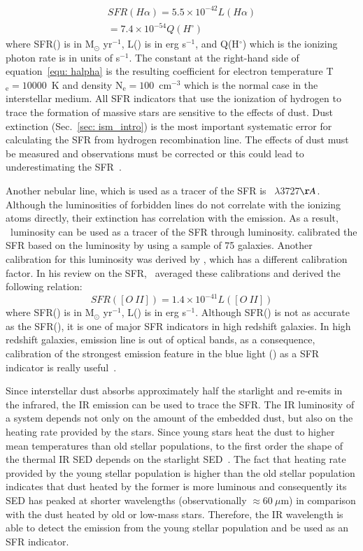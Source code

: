 \begin{align}
\label{equ: halpha}
SFR(H\alpha) = 5.5 \times 10^{-42}L(H\alpha) \\
                     = 7.4 \times 10^{-54}Q(H^{\circ})
\end{align}
where SFR(\halpha) is in M$_{\odot}$ yr$^{-1}$, L(\halpha) is in erg s$^{-1}$, and Q(H$^{\circ}$) which is the ionizing photon rate is in units of s$^{-1}$.
The constant at the right-hand side of equation~\ref{equ: halpha} is the resulting coefficient for electron temperature T$_{\mathrm{e}}=10000$~K and density N$_{\mathrm{e}}=100$~cm$^{-3}$ which is the normal case in the interstellar medium. 
All SFR indicators that use the ionization of hydrogen to trace the formation of massive stars are sensitive to the effects of dust.
Dust extinction (Sec.~\ref{sec: ism_intro}) is the most important systematic error for calculating the SFR from hydrogen recombination line.
The effects of dust must be measured and \halpha observations must be corrected or this could lead to underestimating the SFR~\citep{Kennicutt98b}. 

Another nebular line, which is used as a tracer of the SFR is \oii~$\lambda$3727$\AA$.
Although the luminosities of forbidden lines do not correlate with the ionizing atoms directly, their extinction has correlation with the \halpha emission. 
As a result, \oii~luminosity can be used as a tracer of the SFR through \halpha luminosity.
\cite{Gallagher89} calibrated the SFR based on the \oii luminosity by using a sample of 75 galaxies. 
Another calibration for this luminosity was derived by \cite{Kennicutt92}, which has a different calibration factor. 
In his review on the SFR,~\citep{Kennicutt98b} averaged these calibrations and derived the following relation:
\begin{equation}
SFR([O\ II]) = 1.4 \times 10^{-41} L([O\ II])
\end{equation}  
where SFR(\oii) is in M$_{\odot}$ yr$^{-1}$, L(\halpha) is in erg s$^{-1}$. 
Although SFR(\oii) is not as accurate as the SFR(\halpha), it is one of major SFR indicators in high redshift galaxies.
In high redshift galaxies, \halpha emission line is out of optical bands, as a consequence, calibration of the strongest emission feature in the blue light (\oii) as a SFR indicator is really useful~\citep{Kennicutt98b}.


Since interstellar dust absorbs approximately half the starlight and re-emits in the infrared, the IR emission can be used to trace the SFR.
The IR luminosity of a system depends not only on the amount of the embedded dust, but also on the heating rate provided by the stars. 
Since young stars heat the dust to higher mean temperatures than old stellar populations, to the first order the shape of the thermal IR SED depends on the starlight SED~\citep{Helou86}.
The fact that heating rate provided by the young stellar population is higher than the old stellar population indicates that dust heated by the former is more luminous and consequently its SED has peaked at shorter wavelengths (observationally $\approx 60~\mu$m) in comparison with the dust heated by old or low-mass stars.
Therefore, the IR wavelength is able to detect the emission from the young stellar population and be used as an SFR indicator.  

